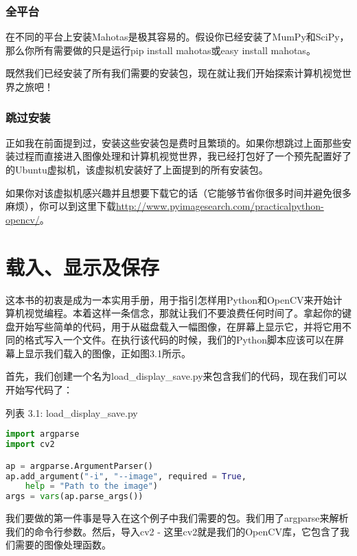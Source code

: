 \documentclass[color=green,mathpazo,titlestyle=hang]{elegantbook}
\begin{document}
\subsection{全平台}

在不同的平台上安装Mahotas是极其容易的。假设你已经安装了MumPy和SciPy，那么你所有需要做的只是运行pip install mahotas或easy install mahotas。

既然我们已经安装了所有我们需要的安装包，现在就让我们开始探索计算机视觉世界之旅吧！

\subsection{跳过安装}

正如我在前面提到过，安装这些安装包是费时且繁琐的。如果你想跳过上面那些安装过程而直接进入图像处理和计算机视觉世界，我已经打包好了一个预先配置好了的Ubuntu虚拟机，该虚拟机安装好了上面提到的所有安装包。

如果你对该虚拟机感兴趣并且想要下载它的话（它能够节省你很多时间并避免很多麻烦），你可以到这里下载\href{http://www.pyimagesearch.com/practicalpython-opencv/}{http://www.pyimagesearch.com/practicalpython-opencv/}。

\chapter{载入、显示及保存}

这本书的初衷是成为一本实用手册，用于指引怎样用Python和OpenCV来开始计算机视觉编程。本着这样一条信念，那就让我们不要浪费任何时间了。拿起你的键盘开始写些简单的代码，用于从磁盘载入一幅图像，在屏幕上显示它，并将它用不同的格式写入一个文件。在执行该代码的时候，我们的Python脚本应该可以在屏幕上显示我们载入的图像，正如图3.1所示。

首先，我们创建一个名为load\_display\_save.py来包含我们的代码，现在我们可以开始写代码了：

列表 3.1: load\_display\_save.py

\begin{lstlisting}[language=python]
import argparse
import cv2

ap = argparse.ArgumentParser()
ap.add_argument("-i", "--image", required = True,
	help = "Path to the image")
args = vars(ap.parse_args())
\end{lstlisting}

我们要做的第一件事是导入在这个例子中我们需要的包。我们用了argparse来解析我们的命令行参数。然后，导入cv2 - 这里cv2就是我们的OpenCV库，它包含了我们需要的图像处理函数。
\end{document}
